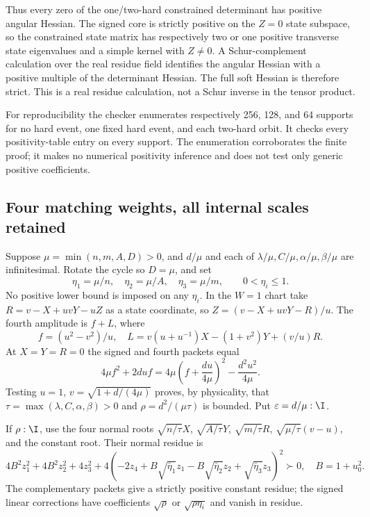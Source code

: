 Thus every zero of the one/two-hard constrained determinant has positive
angular Hessian. The signed core is strictly positive on the $Z=0$
state subspace, so the constrained state matrix has respectively two
or one positive transverse state eigenvalues and a simple kernel with
$Z\ne0$. A Schur-complement calculation over the real residue field
identifies the angular Hessian with a positive multiple of the determinant
Hessian. The full soft Hessian is therefore strict. This is a real
residue calculation, not a Schur inverse in the tensor product.

For reproducibility the checker enumerates respectively 256, 128, and
64 supports for no hard event, one fixed hard event, and each two-hard
orbit. It checks every positivity-table entry on every support. The
enumeration corroborates the finite proof; it makes no numerical
positivity inference and does not test only generic positive coefficients.

\subsection{Four matching weights, all internal scales retained}

Suppose $\mu=\min(n,m,A,D)>0$, and $d/\mu$ and each of
$\lambda/\mu,C/\mu,\alpha/\mu,\beta/\mu$ are infinitesimal.
Rotate the cycle so $D=\mu$, and set
\[
\eta_1=\mu/n,\quad\eta_2=\mu/A,\quad\eta_3=\mu/m,
\qquad 0<\eta_i\le1.
\]
No positive lower bound is imposed on any $\eta_i$.
In the $W=1$ chart take $R=v-X+uvY-uZ$ as a state coordinate, so
$Z=(v-X+uvY-R)/u$. The fourth amplitude is $f+L$, where
\[
f=(u^2-v^2)/u,\quad
L=v(u+u^{-1})X-(1+v^2)Y+(v/u)R.
\]
At $X=Y=R=0$ the signed and fourth packets equal
\[
4\mu f^2+2duf
=4\mu\left(f+\frac{du}{4\mu}\right)^2-\frac{d^2u^2}{4\mu}.
\]
Testing $u=1$, $v=\sqrt{1+d/(4\mu)}$ proves, by physicality, that
$\tau=\max(\lambda,C,\alpha,\beta)>0$ and
$\rho=d^2/(\mu\tau)$ is bounded. Put $\varepsilon=d/\mu:\I$.

If $\rho:\I$, use the four normal roots
$\sqrt{n/\tau}X$, $\sqrt{A/\tau}Y$, $\sqrt{m/\tau}R$,
$\sqrt{\mu/\tau}(v-u)$, and the constant root. Their normal residue is
\[
4B^2z_1^2+4B^2z_2^2+4z_3^2+
4(-2z_4+B\sqrt{\bar\eta_1}z_1-B\sqrt{\bar\eta_2}z_2
             +\sqrt{\bar\eta_3}z_3)^2\succ0,
\quad B=1+u_0^2.
\]
The complementary packets give a strictly positive constant residue;
the signed linear corrections have coefficients $\sqrt\rho$ or
$\sqrt{\rho\eta_i}$ and vanish in residue.

